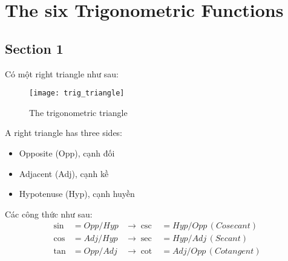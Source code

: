 \chapter{The six Trigonometric Functions}

\section{Section 1}

Có một right triangle như sau:

\begin{figure}[ht]
  \centering
  \texttt{[image: trig\_triangle]}
  \caption{The trigonometric triangle}
\end{figure}

A right triangle has three sides:
\begin{itemize}
  \item Opposite (Opp), cạnh đối
  \item Adjacent (Adj), cạnh kề
  \item Hypotenuse (Hyp), cạnh huyền
\end{itemize}

Các công thức như sau:
\begin{align*}  
\sin &= Opp/Hyp & \longrightarrow \csc &= Hyp/Opp\, (Cosecant) \\
\cos &= Adj/Hyp & \longrightarrow \sec &= Hyp/Adj\, (Secant)\\
\tan &= Opp/Adj & \longrightarrow \cot &= Adj/Opp\, (Cotangent)
\end{align*}